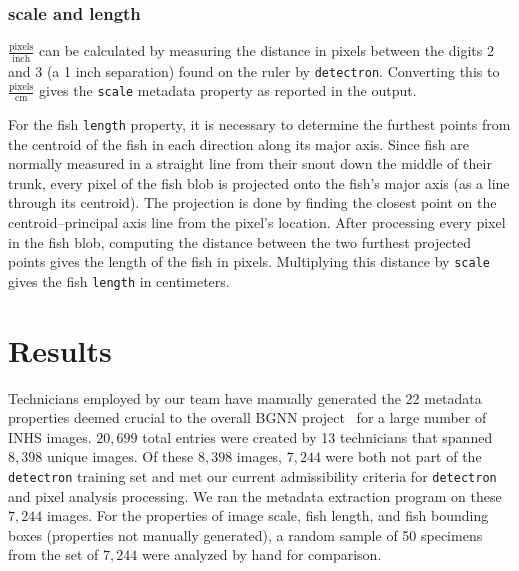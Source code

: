 \documentclass[conference]{IEEEtran}
\begin{document}
\subsubsection{scale and length}
\(\frac{\mathrm{pixels}}{\mathrm{inch}}\) can be calculated by measuring the distance in pixels between the digits 2 and 3 (a 1 inch separation) found on the ruler by \verb|detectron|. Converting this to \(\frac{\mathrm{pixels}}{\mathrm{cm}}\) gives the \verb|scale| metadata property as reported in the output.

For the fish \verb|length| property, it is necessary to determine the furthest points from the centroid of the fish in each direction along its major
axis. Since fish are normally measured in a straight line from their snout down the middle of their trunk, every pixel of the fish blob is projected
onto the fish's major axis (as a line through its centroid).
The projection is done by finding the closest point on the
centroid--principal axis line from the pixel's location.
After processing every pixel in the fish blob, computing the distance
between the two furthest projected points gives the length of the fish in pixels. Multiplying this distance by \verb|scale| gives the fish \verb|length| in centimeters.

\section{Results}
Technicians employed by our team have manually generated the 22 metadata properties deemed crucial to the overall BGNN project~\cite{Leipzig2021.01.28.428644} for a large number of INHS images. \(20,699\) total entries were created by 13 technicians that spanned \(8,398\) unique images. Of these \(8,398\) images, \(7,244\) were both not part of the \verb|detectron| training set and met our current admissibility criteria for \verb|detectron| and pixel analysis processing. We ran the metadata extraction program on these \(7,244\) images.
For the properties of image scale, fish length, and fish bounding boxes
(properties not manually generated),
a random sample of 50 specimens from the set of \(7,244\) were analyzed by
hand for comparison.
\end{document}
